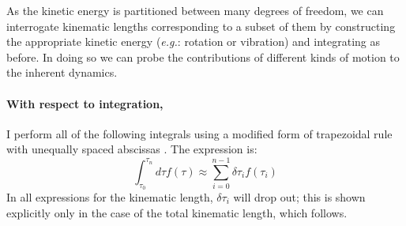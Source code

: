 \documentclass[letterpaper,12pt]{article}
\renewcommand{\vec}[1]{\mathbf{#1}}
\begin{document}
As the kinetic energy is partitioned between many  degrees of freedom, we can interrogate kinematic lengths corresponding to a subset of them by constructing the appropriate kinetic energy (\emph{e.g.}: rotation or vibration) and integrating as before. In doing so we can probe the contributions of different kinds of motion to the inherent dynamics.



\paragraph{With respect to integration,}\hspace{-1em} I perform all of the following integrals using a modified form of trapezoidal rule with unequally spaced abscissas \cite[eq. 25.4.1]{as:1964}. The expression is:
\begin{equation}\label{eqn:integrals}
\int_{\tau_{0}}^{\tau_{n}} d\tau f(\tau)  \approx \sum_{i=0}^{n-1} {\delta \tau}_{i} f\left({\tau}_{i}\right)
\end{equation}
In all expressions for the kinematic length, ${\delta \tau}_{i}$ will drop out; this is shown explicitly only in the case of the total kinematic length, which follows.
\end{document}
